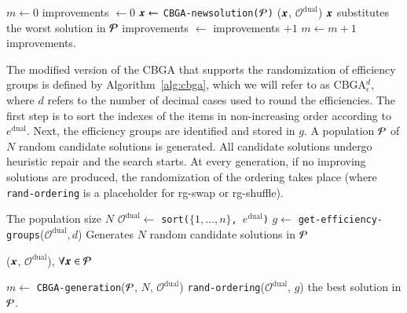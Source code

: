 \documentclass[3p,authoryear]{elsarticle}
\newcommand{\Ord}{\mathcal{O}}
\newcommand{\CBGAe}{\gls{CBGA}$^d_\epsilon$\xspace}
\begin{document}
\begin{algorithm}[h!t]
	\caption{{\tt CBGA-generation}($\p, N, \Ord^\text{dual}$)}
	\label{alg:cbga-generation}
	\begin{algorithmic}[1]	
		\State $m \gets 0$
		\State improvements $\gets 0$
			   \State $\boldsymbol{x}\gets$ {\tt CBGA-newsolution($\mathcal{P}$)}
			   ($\boldsymbol{x}$, $\Ord^\text{dual}$)
			   	\State $\boldsymbol{x}$ substitutes the worst solution in $\mathcal{P}$
			   	\State improvements $\gets$ improvements $+ 1$
			   \EndIf
			   \State $m \gets m + 1$
		\EndWhile
		\State \Return improvements.		
	\end{algorithmic}
\end{algorithm}

The modified version of the \gls{CBGA} that supports the randomization of efficiency groups is defined by Algorithm~\ref{alg:cbga}, which we will refer to as \CBGAe, where $d$ refers to the number of decimal cases used to round the efficiencies. The first step is to sort the indexes of the items in non-increasing order according to $e^\text{dual}$. Next, the efficiency groups are identified and stored in $g$. A population $\mathcal{P}$ of $N$ random candidate solutions is generated. All candidate solutions undergo heuristic repair and the search starts. At every generation, if no improving solutions are produced, the randomization of the ordering takes place (where {\tt rand-ordering} is a placeholder for {\sc rg-swap} or {\sc rg-shuffle}). 

\begin{algorithm}[h!t]
	\caption{\CBGAe}
	\label{alg:cbga}
	\begin{algorithmic}[1]
		\Require The population size $N$
		\State $\Ord^\text{dual}\leftarrow$ \texttt{sort($\{1,\dots,n\}$, $e^\text{dual}$)} 
		\State $g \gets $ {\tt get-efficiency-groups}($\Ord^\text{dual}, d$)
		\State Generates $N$ random candidate solutions in $\mathcal{P}$

		($\boldsymbol{x}$, $\Ord^\text{dual}$), $\forall \boldsymbol{x}\in\mathcal{P}$
		
		
			   \State $m \gets $ {\tt CBGA-generation}($\mathcal{P}$, $N$, $\Ord^\text{dual}$)
			    {{\tt rand-ordering}($\Ord^\text{dual}$, $g$)}
		\EndWhile
		\State \Return the best solution in $\mathcal{P}$.		
	\end{algorithmic}
\end{algorithm}
\end{document}

